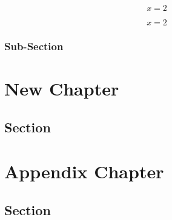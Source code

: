 \documentclass[12pt]{book}
\begin{document}
\begin{equation}
x = 2
\end{equation}

\blindtext

\begin{equation}
x = 2
\end{equation}

\subsection{Sub-Section}

\Blindtext

\chapter{New Chapter}

\blindtext

\section{Section}

\Blindtext


\appendix

\chapter{Appendix Chapter}

\blindtext

\section{Section}

\Blindtext
\end{document}
